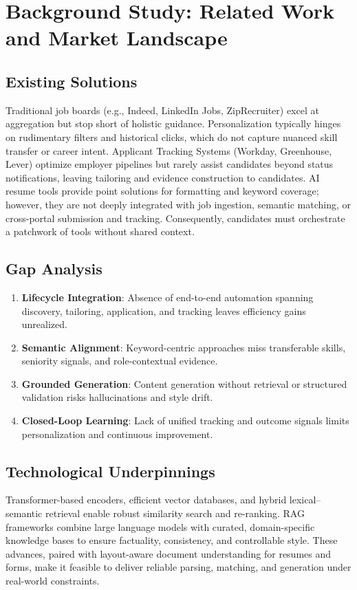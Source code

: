 \documentclass[12pt,a4paper]{report}
\begin{document}
\chapter{Background Study: Related Work and Market Landscape}
\section{Existing Solutions}
Traditional job boards (e.g., Indeed, LinkedIn Jobs, ZipRecruiter) excel at aggregation but stop short of holistic guidance. Personalization typically hinges on rudimentary filters and historical clicks, which do not capture nuanced skill transfer or career intent. Applicant Tracking Systems (Workday, Greenhouse, Lever) optimize employer pipelines but rarely assist candidates beyond status notifications, leaving tailoring and evidence construction to candidates. AI resume tools provide point solutions for formatting and keyword coverage; however, they are not deeply integrated with job ingestion, semantic matching, or cross-portal submission and tracking. Consequently, candidates must orchestrate a patchwork of tools without shared context.

\section{Gap Analysis}
\begin{enumerate}[leftmargin=2em]
  \item \textbf{Lifecycle Integration}: Absence of end-to-end automation spanning discovery, tailoring, application, and tracking leaves efficiency gains unrealized.
  \item \textbf{Semantic Alignment}: Keyword-centric approaches miss transferable skills, seniority signals, and role-contextual evidence.
  \item \textbf{Grounded Generation}: Content generation without retrieval or structured validation risks hallucinations and style drift.
  \item \textbf{Closed-Loop Learning}: Lack of unified tracking and outcome signals limits personalization and continuous improvement.
\end{enumerate}

\section{Technological Underpinnings}
Transformer-based encoders, efficient vector databases, and hybrid lexical–semantic retrieval enable robust similarity search and re-ranking. RAG frameworks combine large language models with curated, domain-specific knowledge bases to ensure factuality, consistency, and controllable style. These advances, paired with layout-aware document understanding for resumes and forms, make it feasible to deliver reliable parsing, matching, and generation under real-world constraints.
\end{document}
